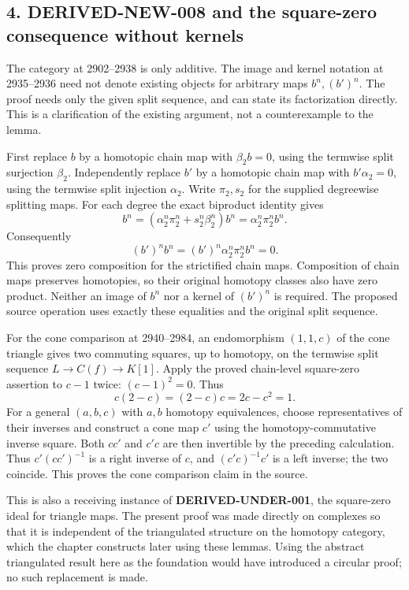 \subsection{4. DERIVED-NEW-008 and the square-zero consequence without kernels}\label{proofs-2419-2994-derived-new-008-and-the-square-zero-consequence-without-kernels}

The category at 2902–\allowbreak{}2938 is only additive. The image and kernel notation at 2935–\allowbreak{}2936 need not denote existing objects for arbitrary maps \(b^n,(b')^n\). The proof needs only the given split sequence,\allowbreak{} and can state its factorization directly. This is a clarification of the existing argument,\allowbreak{} not a counterexample to the lemma.

First replace \(b\) by a homotopic chain map with \(\beta_2b=0\),\allowbreak{} using the termwise split surjection \(\beta_2\). Independently replace \(b'\) by a homotopic chain map with \(b'\alpha_2=0\),\allowbreak{} using the termwise split injection \(\alpha_2\). Write \(\pi_2,s_2\) for the supplied degreewise splitting maps. For each degree the exact biproduct identity gives \[
b^n=(\alpha_2^n\pi_2^n+s_2^n\beta_2^n)b^n
=\alpha_2^n\pi_2^nb^n.
\] Consequently \[
(b')^nb^n=(b')^n\alpha_2^n\pi_2^nb^n=0.
\] This proves zero composition for the strictified chain maps. Composition of chain maps preserves homotopies,\allowbreak{} so their original homotopy classes also have zero product. Neither an image of \(b^n\) nor a kernel of \((b')^n\) is required. The proposed source operation uses exactly these equalities and the original split sequence.

For the cone comparison at 2940–\allowbreak{}2984,\allowbreak{} an endomorphism \((1,1,c)\) of the cone triangle gives two commuting squares,\allowbreak{} up to homotopy,\allowbreak{} on the termwise split sequence \(L\to C(f)\to K[1]\). Apply the proved chain-level square-zero assertion to \(c-1\) twice:\allowbreak{} \((c-1)^2=0\). Thus \[
c(2-c)=(2-c)c=2c-c^2=1.
\] For a general \((a,b,c)\) with \(a,b\) homotopy equivalences,\allowbreak{} choose representatives of their inverses and construct a cone map \(c'\) using the homotopy-commutative inverse square. Both \(cc'\) and \(c'c\) are then invertible by the preceding calculation. Thus \(c' (cc')^{-1}\) is a right inverse of \(c\),\allowbreak{} and \((c'c)^{-1}c'\) is a left inverse; the two coincide. This proves the cone comparison claim in the source.

This is also a receiving instance of \textbf{DERIVED-UNDER-001},\allowbreak{} the square-zero ideal for triangle maps. The present proof was made directly on complexes so that it is independent of the triangulated structure on the homotopy category,\allowbreak{} which the chapter constructs later using these lemmas. Using the abstract triangulated result here as the foundation would have introduced a circular proof; no such replacement is made.
